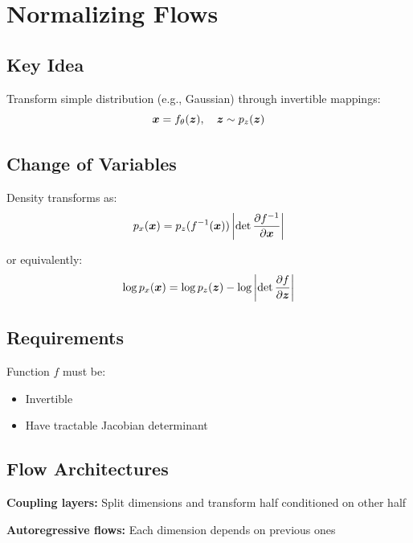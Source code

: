 
\section{Normalizing Flows}
\label{sec:normalizing-flows}

\subsection{Key Idea}

Transform simple distribution (e.g., Gaussian) through invertible mappings:
\begin{equation}
\boldsymbol{x} = f_{\theta}(\boldsymbol{z}), \quad \boldsymbol{z} \sim p_z(\boldsymbol{z})
\end{equation}

\subsection{Change of Variables}

Density transforms as:
\begin{equation}
p_x(\boldsymbol{x}) = p_z(f^{-1}(\boldsymbol{x})) \left|\det \frac{\partial f^{-1}}{\partial \boldsymbol{x}}\right|
\end{equation}

or equivalently:
\begin{equation}
\log p_x(\boldsymbol{x}) = \log p_z(\boldsymbol{z}) - \log\left|\det \frac{\partial f}{\partial \boldsymbol{z}}\right|
\end{equation}

\subsection{Requirements}

Function $f$ must be:
\begin{itemize}
    \item Invertible
    \item Have tractable Jacobian determinant
\end{itemize}

\subsection{Flow Architectures}

\textbf{Coupling layers:} Split dimensions and transform half conditioned on other half

\textbf{Autoregressive flows:} Each dimension depends on previous ones

